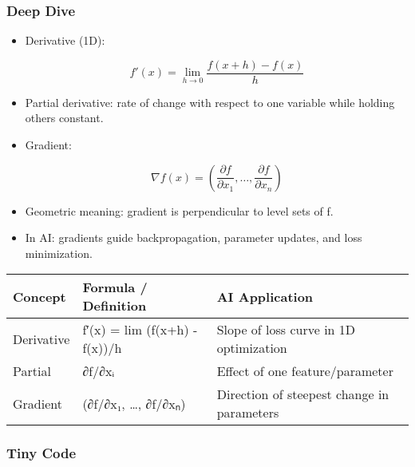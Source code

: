 \documentclass[
  letterpaper,
  DIV=11,
  numbers=noendperiod]{scrreprt}
\begin{document}
\subsubsection{Deep Dive}\label{deep-dive-111}

\begin{itemize}
\item
  Derivative (1D):

  \[
  f'(x) = \lim_{h \to 0} \frac{f(x+h) - f(x)}{h}
  \]
\item
  Partial derivative: rate of change with respect to one variable while
  holding others constant.
\item
  Gradient:

  \[
  \nabla f(x) = \left(\frac{\partial f}{\partial x_1}, \dots, \frac{\partial f}{\partial x_n}\right)
  \]
\item
  Geometric meaning: gradient is perpendicular to level sets of f.
\item
  In AI: gradients guide backpropagation, parameter updates, and loss
  minimization.
\end{itemize}

\begin{longtable}[]{@{}
  >{\raggedright\arraybackslash}p{}
  >{\raggedright\arraybackslash}p{}
  >{\raggedright\arraybackslash}p{}@{}}
\toprule\noalign{}
\begin{minipage}[b]{\linewidth}\raggedright
Concept
\end{minipage} & \begin{minipage}[b]{\linewidth}\raggedright
Formula / Definition
\end{minipage} & \begin{minipage}[b]{\linewidth}\raggedright
AI Application
\end{minipage} \\
\midrule\noalign{}
\endhead
\bottomrule\noalign{}
\endlastfoot
Derivative & f′(x) = lim (f(x+h) - f(x))/h & Slope of loss curve in 1D
optimization \\
Partial & ∂f/∂xᵢ & Effect of one feature/parameter \\
Gradient & (∂f/∂x₁, \ldots, ∂f/∂xₙ) & Direction of steepest change in
parameters \\
\end{longtable}

\subsubsection{Tiny Code}\label{tiny-code-111}
\end{document}
